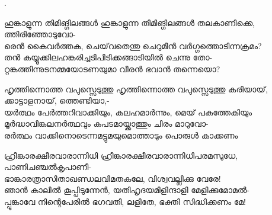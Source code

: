 \begin{enumerate}

.


\begin{slokam}{\VSv}{\TMV}{ഹുങ്കാളുന്ന തിമിങ്ഗിലങ്ങള്‍}
ഹുങ്കാളുന്ന തിമിങ്ഗിലങ്ങള്‍ തലകാണിക്കെ, ത്തിരിഞ്ഞോടുവോ-\\
രെൻ കൈവർത്തക, ചെയ്‌വതെന്തു ചെറുമീൻ വർഗ്ഗത്തൊടിന്നക്രമം?\\
തൻ കയ്യൂക്കിലഹങ്കരിച്ചടിപിടിക്കങ്ങാടിയിൽ ചെന്നു തോ-\\
റ്റങ്കത്തിന്നുടനമ്മയോടണയുമാ വീരൻ ഭവാൻ തന്നെയൊ?
\end{slokam}




\begin{slokam}{\VSv}{\RV}{ഹൃത്തിന്നൊത്ത വപുസ്സെടുത്തു}
ഹൃത്തിന്നൊത്ത വപുസ്സെടുത്തു കരിയായ്‌, ക്കാട്ടാളനായ്‌, ത്തെണ്ടിയാ,-\\
യർത്ഥം പേർത്തറിവാക്കിയും, കലഹമാർന്നും, മെയ്‌ പകുത്തേകിയും\\
മൂർദ്ധാവിങ്കലനർത്ഥവും കപടമായ്ക്കാത്തും ചിരം മാറുവോ-\\
രർത്ഥം വാക്കിനൊടെന്നമട്ടുമയുമൊത്താടും പൊരുൾ കാക്കണം
\end{slokam}


\begin{slokam}{\VSr}{\VNM}{ഹ്രീങ്കാരക്ഷീരവാരാന്നിധി}
 ഹ്രീങ്കാരക്ഷീരവാരാന്നിധിപരമസുധേ, പാണിചഞ്ചൽകൃപാണീ-\\
ഭാങ്കാരത്രാസിതാഖണ്ഡലവിമതകലേ, വിശ്വവല്ലിക്കു വേരേ!\\
ഞാൻ കാലിൽ കൂപ്പിടുന്നേൻ, യതിഹൃദയമിളിന്ദാളി മേളിക്കുമോമൽ-\\
പ്പൂങ്കാവേ നിന്റെപേരിൽ ഭഗവതി, ലളിതേ, ഭക്തി സിദ്ധിക്കണം മേ!
\end{slokam}



\end{enumerate}

